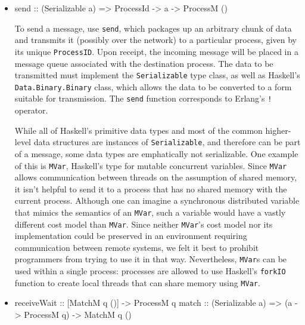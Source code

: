 \documentclass[preprint]{sigplanconf}
\begin{document}
\begin{itemize}
\item 
\begin{code}
send :: (Serializable a) => ProcessId -> a -> ProcessM ()
\end{code}

To send a message, use \texttt{send}, which packages up an arbitrary chunk of data and transmits it (possibly over the network) to a particular process, given by its unique \texttt{ProcessID}. Upon receipt, the incoming message will be placed in a message queue associated with the destination process. The data to be transmitted must implement the \texttt{Serializable} type class, as well as Haskell's \texttt{Data.Binary.Binary} class, which allows the data to be converted to a form suitable for transmission. The \texttt{send} function corresponds to Erlang's \texttt{!} operator.

While all of Haskell's primitive data types and most of the common higher-level data structures are instances of \texttt{Serializable}, and therefore can be part of a message, some data types are emphatically not serializable. One example of this is \texttt{MVar}, Haskell's type for mutable concurrent variables. Since \texttt{MVar} allows communication between threads on the assumption of shared memory, it isn't helpful to send it to a process that has no shared memory with the current process. Although one can imagine a synchronous distributed variable that mimics the semantics of an \texttt{MVar}, such a variable would have a vastly different cost model than \texttt{MVar}. Since neither \texttt{MVar}'s cost model nor its implementation could be preserved in an environment requiring communication between remote systems, we felt it best to prohibit programmers from trying to use it in that way. Nevertheless, \texttt{MVar}s can be used within a single process: processes are allowed to use Haskell's \texttt{forkIO} function to create local threads that can share memory using \texttt{MVar}.

\item 
\begin{code}
receiveWait :: [MatchM q ()] -> ProcessM q
match :: (Serializable a) => (a -> ProcessM q) -> MatchM q ()
\end{code}


\end{itemize}
\end{document}
